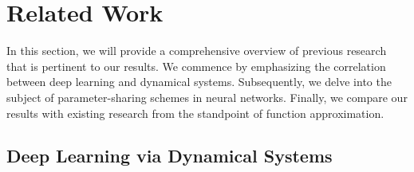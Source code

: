 \documentclass[nohyperref]{article}
\theoremstyle{plain}
\theoremstyle{definition}
\theoremstyle{remark}
\begin{document}
\section{Related Work}
\label{sec:related:work}

%
In this section, we will provide a comprehensive overview of previous research that is pertinent to our results. We commence by emphasizing the correlation between deep learning and dynamical systems. Subsequently, we delve into the subject of parameter-sharing schemes in neural networks. Finally, we compare our results with existing research from the standpoint of function approximation.
  
%
%
\subsection{Deep Learning via Dynamical Systems}
\label{sec:dynamical:systems}
\end{document}
